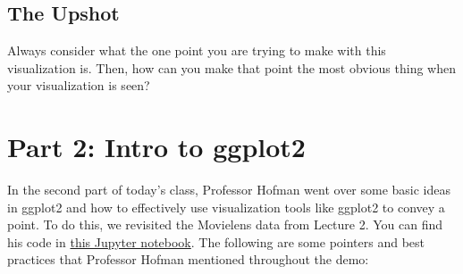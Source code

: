\subsection{The Upshot} 
Always consider what the one point you are trying to make with this visualization is. Then, how can you make that point the most obvious thing when your visualization is seen?

\section{Part 2: Intro to ggplot2}
In the second part of today's class, Professor Hofman went over some basic ideas in ggplot2 and how to effectively use visualization tools like ggplot2 to convey a point. To do this, we revisited the Movielens data from Lecture 2. You can find his code in \href{https://github.com/jhofman/msd2017/blob/master/lectures/lecture_5/visualization_with_ggplot2.ipynb}{this Jupyter notebook}. The following are some pointers and best practices that Professor Hofman mentioned throughout the demo:
